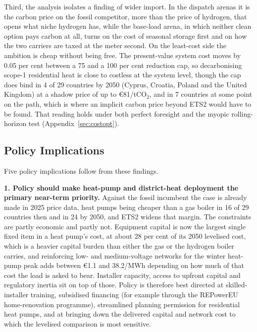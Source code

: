 Third, the analysis isolates a finding of wider import. In the dispatch arenas it is
the carbon price on the fossil competitor, more than the price of hydrogen, that
opens what niche hydrogen has, while the base-load arena, in which neither clean
option pays carbon at all, turns on the cost of seasonal storage first and on how
the two carriers are taxed at the meter second. On the least-cost side the ambition
is cheap without being free. The
present-value system cost moves by 0.05 per cent between a 75 and a 100 per cent
reduction cap, so decarbonising scope-1 residential heat is close to costless at the
system level, though the cap does bind in 4 of 29 countries by 2050 (Cyprus, Croatia,
Poland and the United Kingdom) at a shadow price of up to \euro{}81/tCO$_2$, and in
7 countries at some point on the path, which is where an implicit carbon price beyond
ETS2 would have to be found. That reading holds under both perfect foresight
and the myopic rolling-horizon test (Appendix~\ref{sec:costopt}).

\subsection{Policy Implications}
\label{sec:conc:policy}

Five policy implications follow from these findings.

\textbf{1. Policy should make heat-pump and district-heat deployment the primary
near-term priority.} Against the fossil incumbent the case is already made in 2025
price data, heat pumps being cheaper than a gas boiler in 16 of 29 countries then and
in 24 by 2050, and ETS2 widens that margin. The constraints are partly economic and
partly not. Equipment capital is now the largest single fixed item in a heat pump's
cost, at about 28 per cent of its 2050 levelised cost, which is a heavier capital
burden than either the gas or the hydrogen boiler carries, and reinforcing low- and
medium-voltage networks for the winter heat-pump peak adds between \euro{}1.1 and
38.2/MWh depending on how much of that cost the load is asked to bear. Installer
capacity, access to upfront capital and regulatory inertia sit on top of those.
Policy is therefore best directed at skilled-installer training, subsidised
financing (for example through the REPowerEU home-renovation programme),
streamlined planning permission for residential heat pumps, and at bringing down the
delivered capital and network cost to which the levelised comparison is most
sensitive.

